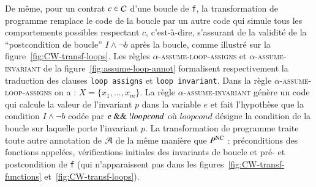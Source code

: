 De même, pour un contrat $c\in{\ensuremath\mathcal{C}}$ d'une boucle de \lstinline'f', la
transformation de programme remplace le code de la boucle par un autre code qui
simule tous les comportements possibles respectant $c$, c'est-à-dire, s'assurant
de la validité de la ``postcondition de boucle'' $I \land \lnot b$ après la
boucle, comme illustré sur la figure~\ref{fig:CW-transf-loops}.
Les règles \textsc{$\alpha$-assume-loop-assigns} et
\textsc{$\alpha$-assume-invariant} de la figure~\ref{fig:assume-loop-annot}
formalisent respectivement la traduction des clauses \lstinline'loop assigns' et
\lstinline'loop invariant'.
Dans la règle \textsc{$\alpha$-assume-loop-assigns} on a :
$X = \{x_1, ..., x_m\}$.
La règle \textsc{$\alpha$-assume-invariant} génère un code qui calcule la valeur
de l'invariant $p$ dans la variable $e$ et fait l'hypothèse que la condition
$I \land \lnot b$ codée par $e~\mbox{\lstinline'\&\& !'}loopcond$ où $loopcond$
désigne la condition de la boucle sur laquelle porte l'invariant $p$.
La transformation de programme traite toute autre annotation de ${\mathcal{A}}$ de la
même manière que $P^{\mathrm{NC}}$ : préconditions des fonctions appelées, vérifications
initiales des invariants de boucle et pré- et postcondition de \lstinline'f'
(qui n'apparaissent pas dans les figures~\ref{fig:CW-transf-functions}
et~\ref{fig:CW-transf-loops}).


\begin{figure}[tb]
  \begin{minipage}{0.5\columnwidth}
    
  \end{minipage}
  \begin{minipage}{0.5\columnwidth}
    
  \end{minipage}
\end{figure}

